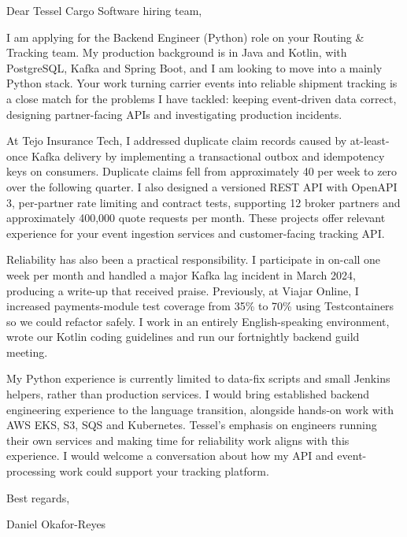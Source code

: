 \documentclass[11pt,a4paper]{article}
\begin{document}
Dear Tessel Cargo Software hiring team,

I am applying for the Backend Engineer (Python) role on your Routing \& Tracking team. My production background is in Java and Kotlin, with PostgreSQL, Kafka and Spring Boot, and I am looking to move into a mainly Python stack. Your work turning carrier events into reliable shipment tracking is a close match for the problems I have tackled: keeping event-driven data correct, designing partner-facing APIs and investigating production incidents.

At Tejo Insurance Tech, I addressed duplicate claim records caused by at-least-once Kafka delivery by implementing a transactional outbox and idempotency keys on consumers. Duplicate claims fell from approximately 40 per week to zero over the following quarter. I also designed a versioned REST API with OpenAPI 3, per-partner rate limiting and contract tests, supporting 12 broker partners and approximately 400,000 quote requests per month. These projects offer relevant experience for your event ingestion services and customer-facing tracking API.

Reliability has also been a practical responsibility. I participate in on-call one week per month and handled a major Kafka lag incident in March 2024, producing a write-up that received praise. Previously, at Viajar Online, I increased payments-module test coverage from 35\% to 70\% using Testcontainers so we could refactor safely. I work in an entirely English-speaking environment, wrote our Kotlin coding guidelines and run our fortnightly backend guild meeting.

My Python experience is currently limited to data-fix scripts and small Jenkins helpers, rather than production services. I would bring established backend engineering experience to the language transition, alongside hands-on work with AWS EKS, S3, SQS and Kubernetes. Tessel's emphasis on engineers running their own services and making time for reliability work aligns with this experience. I would welcome a conversation about how my API and event-processing work could support your tracking platform.

Best regards,\par
Daniel Okafor-Reyes
\end{document}
